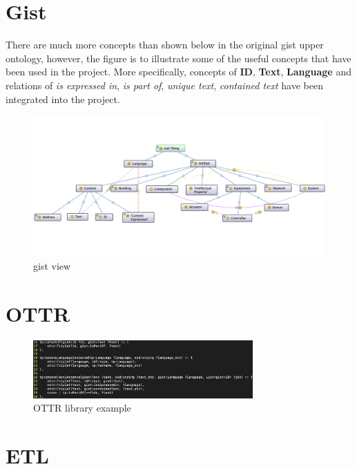 \section{Gist}

There are much more concepts than shown below in the original gist upper ontology, however, the figure 
is to illustrate some of the useful concepts that have been used in the project. More specifically, 
concepts of \textbf{ID}, \textbf{Text}, \textbf{Language} and relations of \textit{is expressed in}, 
\textit{is part of}, \textit{unique text}, \textit{contained text} have been integrated into the project.

\begin{figure}[ht]
	\centering
	\includegraphics[width=\textwidth]{../../resources/gist_view.png}
	\caption{gist view}
	\label{fig:gist_view}
\end{figure}

\section{OTTR}

\begin{figure}[H]
	\centering
	\includegraphics[width=0.75\textwidth]{../../resources/ottr_lib_example.png}
	\caption{OTTR library example}
	\label{fig:ottr_library_example}
\end{figure}

\section{ETL}

